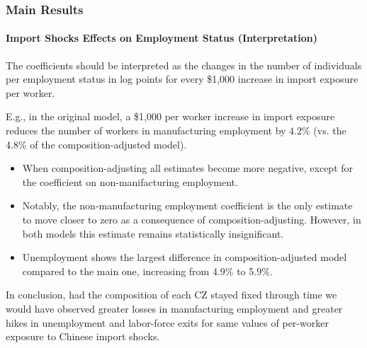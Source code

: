 \begin{frame}
    \frametitle{Main Results}
    \framesubtitle{Import Shocks Effects on Employment Status (Interpretation)}
    
    The coefficients should be interpreted as the changes in the number of individuals per employment status in log points for every \$1,000 increase in import exposure per worker.

    E.g., in the original model, a \$1,000 per worker increase in import exposure reduces the number of workers in manufacturing employment by 4.2\% (vs. the 4.8\% of the composition-adjusted model).

    \begin{itemize}
        \item When composition-adjusting all estimates become more negative, except for the coefficient on non-manifacturing employment.
        \item Notably, the non-manufacturing employment coefficient is the only estimate to move closer to zero as a consequence of composition-adjusting. However, in both models this estimate remains statistically insignificant.
        \item Unemployment shows the largest difference in composition-adjusted model compared to the main one, increasing from 4.9\% to 5.9\%.
    \end{itemize}

    In conclusion, had the composition of each CZ stayed fixed through time we would have observed greater losses in manufacturing employment and greater hikes in unemployment and labor-force exits for same values of per-worker exposure to Chinese import shocks.
\end{frame}

